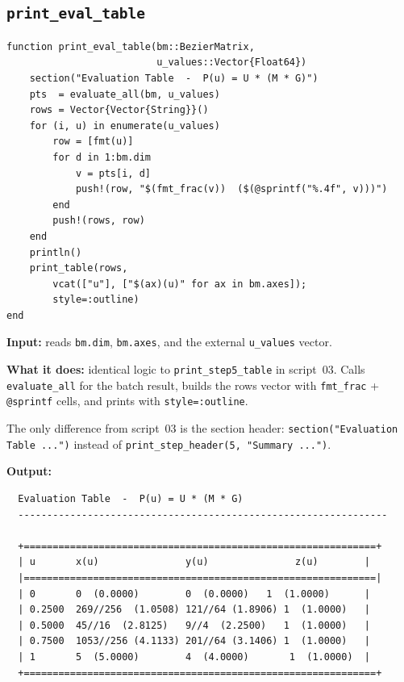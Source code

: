 \documentclass[12pt, a4paper]{article}
\newcommand{\cd}[1]{\texttt{#1}}
\begin{document}
\subsection{\texttt{print\_eval\_table}}

\begin{verbatim}
function print_eval_table(bm::BezierMatrix,
                          u_values::Vector{Float64})
    section("Evaluation Table  -  P(u) = U * (M * G)")
    pts  = evaluate_all(bm, u_values)
    rows = Vector{Vector{String}}()
    for (i, u) in enumerate(u_values)
        row = [fmt(u)]
        for d in 1:bm.dim
            v = pts[i, d]
            push!(row, "$(fmt_frac(v))  ($(@sprintf("%.4f", v)))")
        end
        push!(rows, row)
    end
    println()
    print_table(rows,
        vcat(["u"], ["$(ax)(u)" for ax in bm.axes]);
        style=:outline)
end
\end{verbatim}

\textbf{Input:} reads \cd{bm.dim}, \cd{bm.axes}, and
the external \cd{u\_values} vector.

\textbf{What it does:} identical logic to
\cd{print\_step5\_table} in script~03.
Calls \cd{evaluate\_all} for the batch result, builds
the rows vector with \cd{fmt\_frac} + \cd{@sprintf} cells,
and prints with \cd{style=:outline}.

The only difference from script~03 is the section header:
\cd{section("Evaluation Table ...")} instead of
\cd{print\_step\_header(5, "Summary ...")}.

\textbf{Output:}
\begin{verbatim}
  Evaluation Table  -  P(u) = U * (M * G)
  ----------------------------------------------------------------

  +=============================================================+
  | u       x(u)               y(u)               z(u)        |
  |=============================================================|
  | 0       0  (0.0000)        0  (0.0000)   1  (1.0000)      |
  | 0.2500  269//256  (1.0508) 121//64 (1.8906) 1  (1.0000)   |
  | 0.5000  45//16  (2.8125)   9//4  (2.2500)   1  (1.0000)   |
  | 0.7500  1053//256 (4.1133) 201//64 (3.1406) 1  (1.0000)   |
  | 1       5  (5.0000)        4  (4.0000)       1  (1.0000)  |
  +=============================================================+
\end{verbatim}

\end{document}
